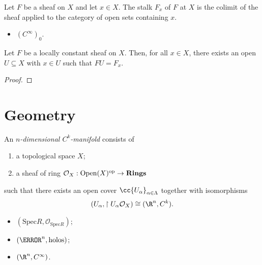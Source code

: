 \documentclass{article}
\begin{document}
\begin{definition}
  Let $F$ be a sheaf on $X$ and let $x\in X$. The stalk $F_x$ of $F$ at $X$ is the
  colimit of the sheaf applied to the category of open sets containing $x$.
\end{definition}

\begin{example}
  \begin{itemize}
    \item $(C^\infty)_0$.
  \end{itemize}
\end{example}

\begin{lemma}
  Let $F$ be a locally constant sheaf on $X$. Then, for all $x\in X$, there exists
  an open $U\subseteq X$ with $x\in U$ such that $FU=F_x$.
  \begin{proof}
    \missingproof
  \end{proof}
\end{lemma}

\section{Geometry}

\begin{definition}
  An \emph{$n$-dimensional $C^k$-manifold} consists of
  \begin{enumerate}
    \item a topological space $X$;
    \item a sheaf of ring $\mathcal O_X:\operatorname{Open}(X)^{\text{op}}\to\textbf{Rings}$
  \end{enumerate}
  such that there exists an open cover $\cc{U_\alpha}_{\alpha\in\Lambda}$
  together with isomorphisms
  \begin{align*}
    (U_\alpha,\restriction{U_\alpha}{\mathcal O_X})\cong (\R^n,C^k).
  \end{align*}
\end{definition}

\begin{example}
  \begin{itemize}
    \item $(\text{Spec} R,\mathcal O_{\text{Spec} R})$;
    \item $(\C^n, \text{holos})$;
    \item $(\R^n, C^\infty)$.
  \end{itemize}
\end{example}

\printbibliography
\end{document}
